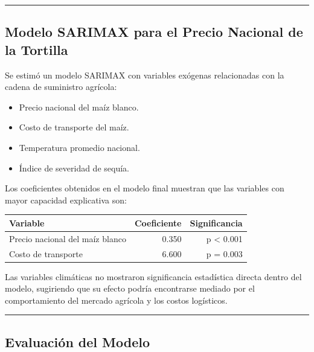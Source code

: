 \documentclass[11pt]{article}
\providecommand{\tightlist}{%
      \setlength{\itemsep}{0pt}\setlength{\parskip}{0pt}}
\begin{document}
\begin{center}\rule{0.5\linewidth}{0.5pt}\end{center}

\hypertarget{modelo-sarimax-para-el-precio-nacional-de-la-tortilla}{%
\subsection{Modelo SARIMAX para el Precio Nacional de la
Tortilla}\label{modelo-sarimax-para-el-precio-nacional-de-la-tortilla}}

Se estimó un modelo SARIMAX con variables exógenas relacionadas con la
cadena de suministro agrícola:

\begin{itemize}
\tightlist
\item
  Precio nacional del maíz blanco.
\item
  Costo de transporte del maíz.
\item
  Temperatura promedio nacional.
\item
  Índice de severidad de sequía.
\end{itemize}

Los coeficientes obtenidos en el modelo final muestran que las variables
con mayor capacidad explicativa son:

\begin{longtable}[]{@{}lrr@{}}
\toprule\noalign{}
Variable & Coeficiente & Significancia \\
\midrule\noalign{}
\endhead
\bottomrule\noalign{}
\endlastfoot
Precio nacional del maíz blanco & 0.350 & p \textless{} 0.001 \\
Costo de transporte & 6.600 & p = 0.003 \\
\end{longtable}

Las variables climáticas no mostraron significancia estadística directa
dentro del modelo, sugiriendo que su efecto podría encontrarse mediado
por el comportamiento del mercado agrícola y los costos logísticos.

\begin{center}\rule{0.5\linewidth}{0.5pt}\end{center}

\hypertarget{evaluaciuxf3n-del-modelo}{%
\subsection{Evaluación del Modelo}\label{evaluaciuxf3n-del-modelo}}
\end{document}
